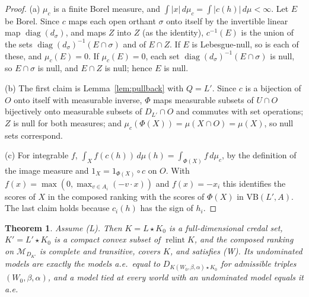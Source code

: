 \documentclass[11pt]{article}
\newcommand{\M}{\mathcal{M}}
\newcommand{\VB}{\mathrm{VB}}
\DeclareMathOperator{\relint}{relint}
\theoremstyle{plain}
\newtheorem{theorem}{Theorem}[section]
\theoremstyle{definition}
\theoremstyle{remark}
\begin{document}
\begin{proof}
(a) $\mu_c$ is a finite Borel measure, and $\int|x|\,d\mu_c=\int|c(h)|\,d\mu<\infty$. Let
$E$ be Borel. Since $c$ maps each open orthant $\sigma$ onto itself by the invertible
linear map $\operatorname{diag}(d_\sigma)$, and maps $Z$ into $Z$ (as the identity),
$c^{-1}(E)$ is the union of the sets $\operatorname{diag}(d_\sigma)^{-1}(E\cap\sigma)$ and
of $E\cap Z$. If $E$ is Lebesgue-null, so is each of these, and $\mu_c(E)=0$. If
$\mu_c(E)=0$, each set $\operatorname{diag}(d_\sigma)^{-1}(E\cap\sigma)$ is null, so
$E\cap\sigma$ is null, and $E\cap Z$ is null; hence $E$ is null.

(b) The first claim is Lemma~\ref{lem:pullback} with $Q=L'$. Since $c$ is a bijection of $O$
onto itself with measurable inverse, $\Phi$ maps measurable subsets of $U\cap O$
bijectively onto measurable subsets of $D_{L'}\cap O$ and commutes with set operations;
$Z$ is null for both measures; and $\mu_c(\Phi(X))=\mu(X\cap O)=\mu(X)$, so null sets
correspond.

(c) For integrable $f$, $\int_Xf(c(h))\,d\mu(h)=\int_{\Phi(X)}f\,d\mu_c$, by the definition
of the image measure and $1_X=1_{\Phi(X)}\circ c$ on $O$. With
$f(x)=\max(0,\max_{v\in A_i}(-v\cdot x))$ and $f(x)=-x_i$ this identifies the scores of $X$
in the composed ranking with the scores of $\Phi(X)$ in $\VB(L',A)$. The last claim holds
because $c_i(h)$ has the sign of $h_i$.
\end{proof}

\begin{theorem}\label{thm:comp}
Assume (L). Then $K=L\star K_0$ is a full-dimensional credal set, $K'=L'\star K_0$ is a
compact convex subset of $\relint K$, and the composed ranking on $\M_{D_{K'}}$ is complete
and transitive, covers $K$, and satisfies (W). Its undominated models are exactly the
models a.e.\ equal to $D_{K(W_0,\beta,\alpha)\star K_0}$ for admissible triples
$(W_0,\beta,\alpha)$, and a model tied at every world with an undominated model equals it
a.e.
\end{theorem}
\end{document}
